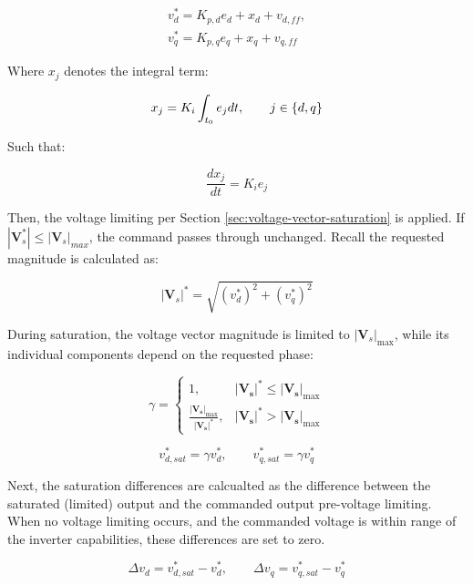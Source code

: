 \documentclass{article}
\begin{document}
\begin{align}
    v_d^* = K_{p,d}e_d + x_d + v_{d,ff}, \\
    v_q^* = K_{p,q}e_q + x_q + v_{q,ff}
\end{align}

Where $x_j$ denotes the integral term:

\begin{equation}
    x_j = K_i\int_{t_0}e_j \space dt, \qquad j \in \{d,q\}
\end{equation}

Such that:

\begin{equation}
    \frac{dx_j}{dt} = K_ie_j
\end{equation}

Then, the voltage limiting per Section \ref{sec:voltage-vector-saturation} is applied. If $|\mathbf{V}_s^*| \leq |\mathbf{V}_s|_{max}$, the command passes through unchanged. Recall the requested magnitude is calculated as:

\begin{equation}
    |\mathbf{V}_s|^* = \sqrt{(v_d^*)^2 + (v_q^*)^2}
\end{equation}

During saturation, the voltage vector magnitude is limited to $|\mathbf{V}_s|_{\max}$, while its individual components depend on the requested phase:

\begin{equation}
    \gamma =
    \begin{cases}
        1, & |\mathbf{V_s}|^* \leq |\mathbf{V_s}|_{\max} \\[4pt]
        \displaystyle\frac{|\mathbf{V_s}|_{\max}}{|\mathbf{V_s}|^*},
        & |\mathbf{V_s}|^* > |\mathbf{V_s}|_{\max}
    \end{cases}
\end{equation}

\begin{equation}
    v_{d,sat}^* = \gamma v_d^*, \qquad
    v_{q,sat}^* = \gamma v_q^*
\end{equation}

Next, the saturation differences are calcualted as the difference between the saturated (limited) output and the commanded output pre-voltage limiting. When no voltage limiting occurs, and the commanded voltage is within range of the inverter capabilities, these differences are set to zero. 

\begin{equation}
    \Delta v_d = v_{d,sat}^* - v_d^*, \qquad
    \Delta v_q = v_{q,sat}^* - v_q^*
\end{equation}
\end{document}
